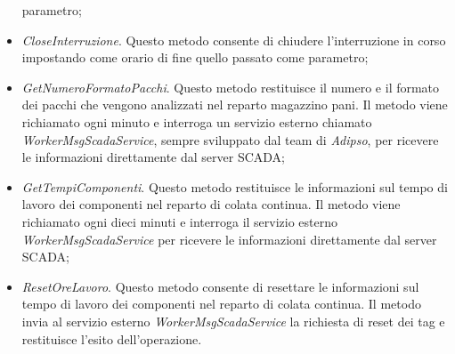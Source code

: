 \begin{itemize}
    parametro;
    \item \textit{CloseInterruzione}. Questo metodo consente di chiudere l'interruzione in corso impostando come
    orario di fine quello passato come parametro;
    \item \textit{GetNumeroFormatoPacchi}. Questo metodo restituisce il numero e il formato dei pacchi che vengono
    analizzati nel reparto magazzino pani. Il metodo viene richiamato ogni minuto e interroga un servizio esterno chiamato
    \textit{WorkerMsgScadaService}, sempre sviluppato dal team di \textit{Adipso}, per ricevere le informazioni direttamente dal
    server SCADA;
    \item \textit{GetTempiComponenti}. Questo metodo restituisce le informazioni sul tempo di lavoro dei componenti
    nel reparto di colata continua. Il metodo viene richiamato ogni dieci minuti e interroga il servizio esterno
    \textit{WorkerMsgScadaService} per ricevere le informazioni direttamente dal server SCADA;
    \item \textit{ResetOreLavoro}. Questo metodo consente di resettare le informazioni sul tempo di lavoro dei
    componenti nel reparto di colata continua. Il metodo invia al servizio esterno \textit{WorkerMsgScadaService} la richiesta
    di reset dei tag e restituisce l'esito dell'operazione.
  \end{itemize}




